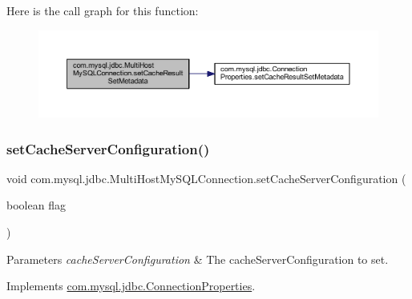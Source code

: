 Here is the call graph for this function\+:
\nopagebreak
\begin{figure}[H]
\begin{center}
\leavevmode
\includegraphics[width=350pt]{classcom_1_1mysql_1_1jdbc_1_1_multi_host_my_s_q_l_connection_a2607114d6964b709318697a7aa065f5f_cgraph}
\end{center}
\end{figure}
\mbox{\label{classcom_1_1mysql_1_1jdbc_1_1_multi_host_my_s_q_l_connection_a0e3c4d032287df8965fe62da0755c244}} 
\subsubsection{\texorpdfstring{set\+Cache\+Server\+Configuration()}{setCacheServerConfiguration()}}
{\footnotesize\ttfamily void com.\+mysql.\+jdbc.\+Multi\+Host\+My\+S\+Q\+L\+Connection.\+set\+Cache\+Server\+Configuration (\begin{DoxyParamCaption}\item[{boolean}]{flag }\end{DoxyParamCaption})}


\begin{DoxyParams}{Parameters}
{\em cache\+Server\+Configuration} & The cache\+Server\+Configuration to set. \\
\hline
\end{DoxyParams}


Implements \mbox{\hyperlink{interfacecom_1_1mysql_1_1jdbc_1_1_connection_properties_a1c4d96777532b47bfa433c3083557cae}{com.\+mysql.\+jdbc.\+Connection\+Properties}}.

